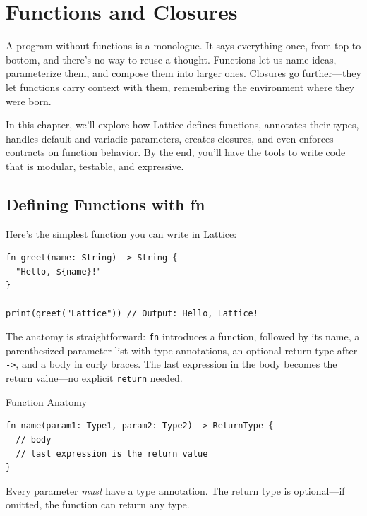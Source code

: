 \chapter{Functions and Closures}\label{ch:functions-closures}


A program without functions is a monologue. It says everything once, from top to bottom, and there's no way to reuse a thought. Functions let us name ideas, parameterize them, and compose them into larger ones. Closures go further---they let functions carry context with them, remembering the environment where they were born.

In this chapter, we'll explore how Lattice defines functions, annotates their types, handles default and variadic parameters, creates closures, and even enforces contracts on function behavior. By the end, you'll have the tools to write code that is modular, testable, and expressive.

\section{Defining Functions with fn}\label{sec:defining-functions}

Here's the simplest function you can write in Lattice:

\begin{lstlisting}[language=Lattice, caption={A basic function}]
fn greet(name: String) -> String {
  "Hello, ${name}!"
}

print(greet("Lattice")) // Output: Hello, Lattice!
\end{lstlisting}

The anatomy is straightforward: \lstinline|fn| introduces a function, followed by its name, a parenthesized parameter list with type annotations, an optional return type after \lstinline|->|, and a body in curly braces. The last expression in the body becomes the return value---no explicit \lstinline|return| needed.

\begin{defnbox}{Function Anatomy}
\begin{lstlisting}[language=Lattice, numbers=none]
fn name(param1: Type1, param2: Type2) -> ReturnType {
  // body
  // last expression is the return value
}
\end{lstlisting}
Every parameter \emph{must} have a type annotation. The return type is optional---if omitted, the function can return any type.
\end{defnbox}

